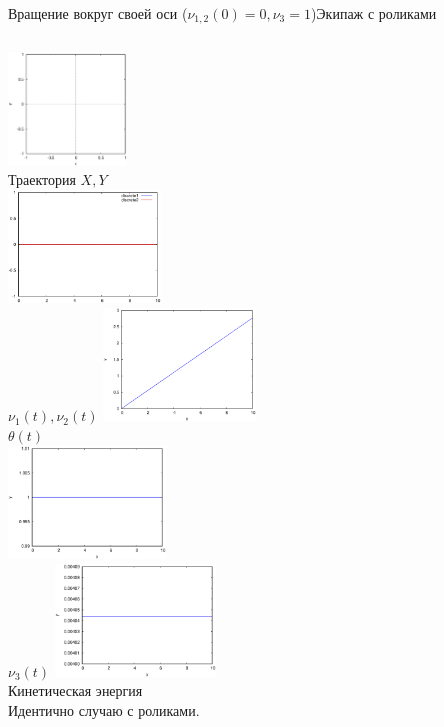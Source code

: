 \documentclass{beamer}
\begin{document}
\begin{frame}{Вращение вокруг своей оси ($\nu_{1,2}(0) = 0, \nu_3 = 1$)}{Экипаж с роликами}
    \begin{columns}
            \centering
            \includegraphics[width=\linewidth, height=30mm]{_sol__0_0_1__0__10__1e2_trajectory} \\
            Траектория $X, Y$ \\
            \includegraphics[width=\linewidth, height=30mm]{_sol__0_0_1__0__10__1e2_nu12} \\
            $\nu_1(t), \nu_2(t)$
            \centering
            \includegraphics[width=\linewidth, height=30mm]{_sol__0_0_1__0__10__1e2_theta} \\
            $\theta(t)$ \\
            \includegraphics[width=\linewidth, height=30mm]{_sol__0_0_1__0__10__1e2_nu3} \\
            $\nu_3(t)$
            \centering
            \includegraphics[width=\linewidth, height=30mm]{_sol__0_0_1__0__10__1e2_kin_en} \\
            Кинетическая энергия \\
            \vspace{15pt}
            Идентично случаю с роликами.
    \end{columns}
\end{frame}
\end{document}
